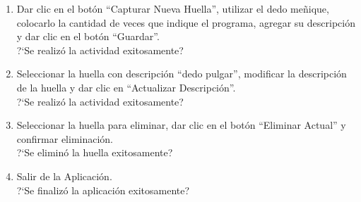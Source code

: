 \begin{enumerate}
{	?`Se realizó la actividad exitosamente?
	}
	\item {Dar clic en el botón ``Capturar Nueva Huella'', utilizar el dedo meñique, colocarlo la cantidad de veces que indique el programa, agregar su descripción y dar clic en el botón ``Guardar''.\\
	?`Se realizó la actividad exitosamente?
	}
	\item {Seleccionar la huella con descripción ``dedo pulgar'', modificar la descripción de la huella y dar clic en ``Actualizar Descripción''.\\
	?`Se realizó la actividad exitosamente?
	}
	\item {Seleccionar la huella para eliminar, dar clic en el botón ``Eliminar Actual'' y confirmar eliminación.\\	
	?`Se eliminó la huella exitosamente?
	}
	\item {Salir de la Aplicación.\\	
	?`Se finalizó la aplicación exitosamente?
	}
\end{enumerate}


